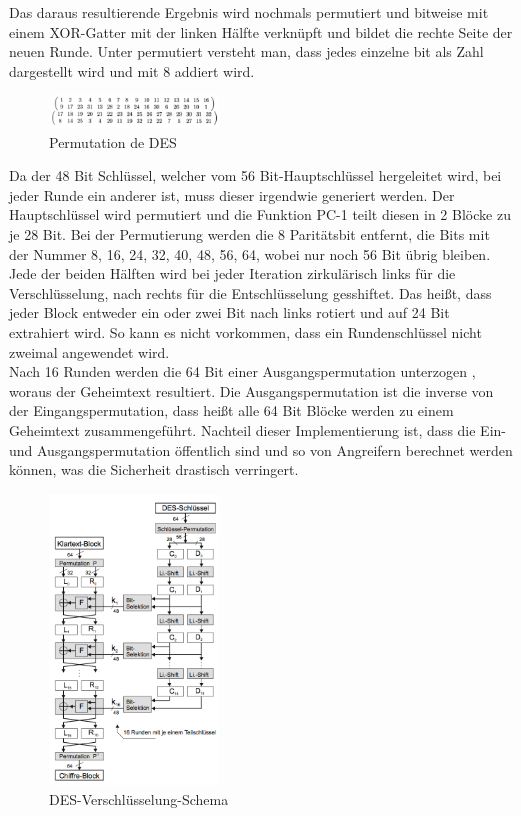 \documentclass[11pt]{scrartcl}
\begin{document}
\noindent Das daraus resultierende Ergebnis wird nochmals permutiert und bitweise mit einem XOR-Gatter mit der linken Hälfte verknüpft und \grqq{}bildet die rechte Seite der neuen Runde.\grqq{} Unter permutiert versteht man, dass jedes einzelne bit als Zahl dargestellt wird und mit 8 addiert wird.\cite{2}
\begin{figure}[H]
\includegraphics[width=0.40\textwidth]{Bilder/DES/DES_Permutation}
	\caption{Permutation de DES \citep{2}}
	\label{fig4}
\end{figure}
\noindent 
Da der 48 Bit Schlüssel, welcher vom 56 Bit-Hauptschlüssel hergeleitet wird, bei jeder Runde ein anderer ist, muss dieser irgendwie generiert werden. Der Hauptschlüssel wird permutiert und die Funktion PC-1 teilt diesen in 2 Blöcke zu je 28 Bit. Bei der Permutierung werden die 8 Paritätsbit entfernt, die Bits mit der Nummer 8, 16, 24, 32, 40, 48, 56, 64, wobei nur noch 56 Bit übrig bleiben. Jede der beiden Hälften wird bei jeder Iteration zirkulärisch links für die Verschlüsselung, nach rechts für die Entschlüsselung gesshiftet. Das heißt, dass jeder Block entweder ein oder zwei Bit nach links rotiert und auf 24 Bit extrahiert wird. So kann es nicht vorkommen, dass ein Rundenschlüssel nicht zweimal angewendet wird.\\
\grqq{}Nach 16 Runden werden die 64 Bit einer Ausgangspermutation unterzogen\grqq{} \cite{2}, woraus der Geheimtext resultiert. Die Ausgangspermutation ist die inverse von der Eingangspermutation, dass heißt alle 64 Bit Blöcke werden zu einem Geheimtext zusammengeführt. Nachteil dieser Implementierung ist, dass die Ein- und Ausgangspermutation öffentlich sind und so von Angreifern berechnet werden können, was die Sicherheit drastisch verringert.
\cite{2}\cite{4}
\begin{figure}[H]
\includegraphics[width=0.40\textwidth]{Bilder/DES/DES_Schema}
	\caption{DES-Verschlüsselung-Schema \citep{3}}
	\label{fig5}
\end{figure}
\end{document}

